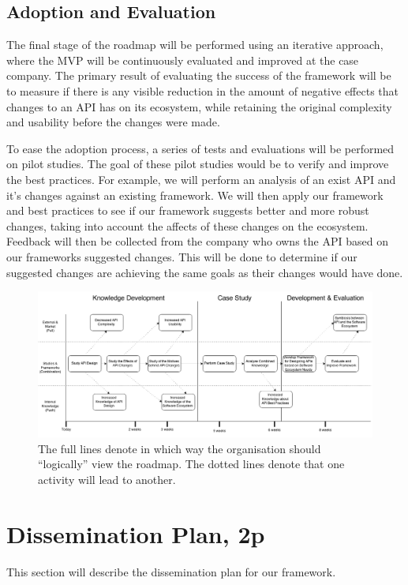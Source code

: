 \documentclass{article}
\begin{document}
\subsection{Adoption and Evaluation}
The final stage of the roadmap will be performed using an iterative approach, where the MVP will be continuously evaluated and improved at the case company. The primary result of evaluating the success of the framework will be to measure if there is any visible reduction in the amount of negative effects that changes to an API has on its ecosystem, while retaining the original complexity and usability before the changes were made. \smallskip

To ease the adoption process, a series of tests and evaluations will be performed on pilot studies. The goal of these pilot studies would be to verify and improve the best practices. For example, we will perform an analysis of an exist API and it's changes against an existing framework. We will then apply our framework and best practices to see if our framework suggests better and more robust changes, taking into account the affects of these changes on the ecosystem. Feedback will then be collected from the company who owns the API based on our frameworks suggested changes. This will be done to determine if our suggested changes are achieving the same goals as their changes would have done.

\begin{figure}
\centering
\includegraphics[width=220mm]{RoadMap.png}
\caption{The full lines denote in which way the organisation should ``logically'' view the roadmap. The dotted lines denote that one activity will lead to another. }
\label{fig:roadmap}
\end{figure}


\section{Dissemination Plan, 2p}
This section will describe the dissemination plan for our framework. 
\end{document}
